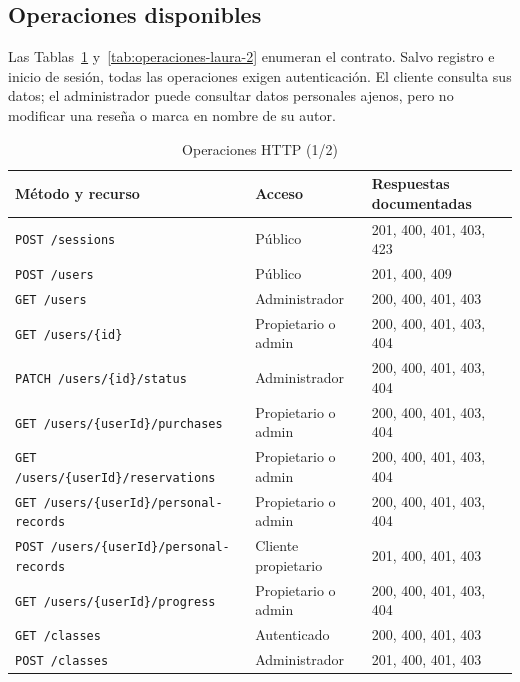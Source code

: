 \subsection{Operaciones disponibles}
Las Tablas~\ref{tab:operaciones-laura-1} y~\ref{tab:operaciones-laura-2} enumeran el contrato. Salvo registro e inicio de sesión, todas las operaciones exigen autenticación. El cliente consulta sus datos; el administrador puede consultar datos personales ajenos, pero no modificar una reseña o marca en nombre de su autor.
\begin{table}[!t]\caption{Operaciones HTTP (1/2)}\label{tab:operaciones-laura-1}\centering\footnotesize
\begin{tabular}{p{}p{}p{}}\toprule
Método y recurso & Acceso & Respuestas documentadas \\ \midrule
\texttt{POST /\allowbreak{}sessions} & Público & 201, 400, 401, 403, 423 \\
\texttt{POST /\allowbreak{}users} & Público & 201, 400, 409 \\
\texttt{GET /\allowbreak{}users} & Administrador & 200, 400, 401, 403 \\
\texttt{GET /\allowbreak{}users/\allowbreak{}\{id\}} & Propietario o admin & 200, 400, 401, 403, 404 \\
\texttt{PATCH /\allowbreak{}users/\allowbreak{}\{id\}/\allowbreak{}status} & Administrador & 200, 400, 401, 403, 404 \\
\texttt{GET /\allowbreak{}users/\allowbreak{}\{userId\}/\allowbreak{}purchases} & Propietario o admin & 200, 400, 401, 403, 404 \\
\texttt{GET /\allowbreak{}users/\allowbreak{}\{userId\}/\allowbreak{}reservations} & Propietario o admin & 200, 400, 401, 403, 404 \\
\texttt{GET /\allowbreak{}users/\allowbreak{}\{userId\}/\allowbreak{}personal-records} & Propietario o admin & 200, 400, 401, 403, 404 \\
\texttt{POST /\allowbreak{}users/\allowbreak{}\{userId\}/\allowbreak{}personal-records} & Cliente propietario & 201, 400, 401, 403 \\
\texttt{GET /\allowbreak{}users/\allowbreak{}\{userId\}/\allowbreak{}progress} & Propietario o admin & 200, 400, 401, 403, 404 \\
\texttt{GET /\allowbreak{}classes} & Autenticado & 200, 400, 401, 403 \\
\texttt{POST /\allowbreak{}classes} & Administrador & 201, 400, 401, 403 \\

\end{tabular}
\end{table}
